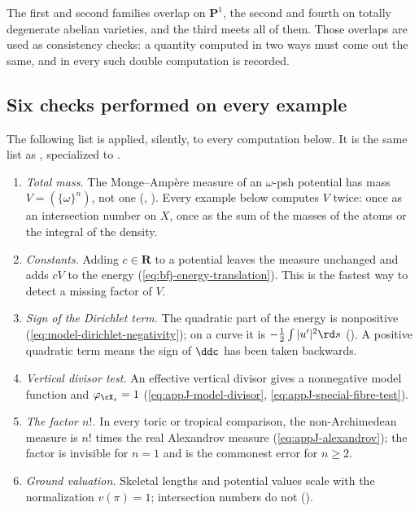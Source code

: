 The first and second families overlap on \(\mathbf P^1\), the second and
fourth on totally degenerate abelian varieties, and the third meets all of
them.  Those overlaps are used as consistency checks: a quantity computed in
two ways must come out the same, and in  every
such double computation is recorded.

\subsection{Six checks performed on every example}
\label{sec:ch31-checks}

The following list is applied, silently, to every computation below.  It is
the same list as , specialized to
.

\begin{enumerate}
\item\label{itm:ch31-check:mass}
 \emph{Total mass.}  The Monge--Amp\`ere measure of an \(\omega\)-psh
 potential has mass \(V=(\{\omega\}^n)\), not one
 (, ).  Every example below
 computes \(V\) twice: once as an intersection number on \(X\), once as the
 sum of the masses of the atoms or the integral of the density.
\item\label{itm:ch31-check:constant}
 \emph{Constants.}  Adding \(c\in\mathbf R\) to a potential leaves the
 measure unchanged and adds \(cV\) to the energy
 (\eqref{eq:bfj-energy-translation}).  This is the fastest way to detect a
 missing factor of \(V\).
\item\label{itm:ch31-check:sign}
 \emph{Sign of the Dirichlet term.}  The quadratic part of the energy is
 nonpositive (\eqref{eq:model-dirichlet-negativity}); on a curve it is
 \(-\tfrac12\int|u'|^2\rd s\) ().  A positive
 quadratic term means the sign of \(\ddc\) has been taken backwards.
\item\label{itm:ch31-check:vertical}
 \emph{Vertical divisor test.}  An effective vertical divisor gives a
 nonnegative model function and \(\varphi_{\cX_s}=1\)
 (\eqref{eq:appJ-model-divisor}, \eqref{eq:appJ-special-fibre-test}).
\item\label{itm:ch31-check:factorial}
 \emph{The factor \(n!\).}  In every toric or tropical comparison, the
 non-Archimedean measure is \(n!\) times the real Alexandrov measure
 (\eqref{eq:appJ-alexandrov}); the factor is invisible for \(n=1\) and is
 the commonest error for \(n\geq2\).
\item\label{itm:ch31-check:normalization}
 \emph{Ground valuation.}  Skeletal lengths and potential values scale with
 the normalization \(v(\pi)=1\); intersection numbers do not
 ().
\end{enumerate}

